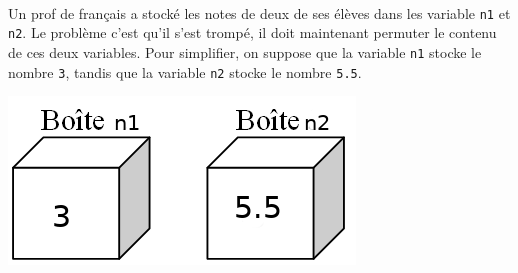 \documentclass[a4paper,12pt]{article}
\begin{document}
\exo{}  ~\\ 
 Un prof de français a stocké les notes de deux de ses élèves dans les variable \lstinline{n1} et \lstinline{n2}. Le problème c'est qu'il s'est trompé, il doit maintenant permuter le contenu de ces deux variables.   Pour simplifier, on suppose que la variable  \lstinline{n1} stocke le nombre  \lstinline{3}, tandis que la variable  \lstinline{n2} stocke le nombre  \lstinline{5.5}.
\begin{center}
	\vspace{-5mm}
	\includegraphics[width=0.3\linewidth]{images/exo_permut.png}
\end{center}
\vspace{-5mm}
\end{document}
